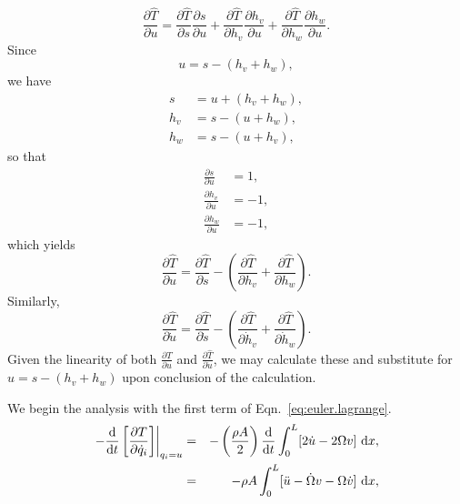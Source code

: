 \begin{equation}
\frac{\partial\hat T}{\partial u} = \frac{\partial \hat T}{\partial s}\frac{\partial s}{\partial u}+\frac{\partial \hat T}{\partial h_v}\frac{\partial h_v}{\partial u}+\frac{\partial \hat T}{\partial h_w}\frac{\partial h_w}{\partial u}.
\end{equation}
Since
\begin{equation}
u = s-(h_v+h_w),
\end{equation}
we have
\begin{eqnarray}
s &= u+(h_v+h_w),\\
h_v &= s-(u+h_w),\\
h_w &= s-(u+h_v),
\end{eqnarray}
so that
\begin{eqnarray}
\frac{\partial s}{\partial u} &= 1,\\
\frac{\partial h_v}{\partial u} &= -1,\\
\frac{\partial h_w}{\partial u} &= -1,
\end{eqnarray}
which yields
\begin{equation}
\frac{\partial\hat T}{\partial u} = \frac{\partial \hat T}{\partial s}-\left(\frac{\partial \hat T}{\partial h_v}+\frac{\partial \hat T}{\partial h_w}\right).
\end{equation}
Similarly,
\begin{equation}
\frac{\partial\hat T}{\partial \dot u} = \frac{\partial \hat T}{\partial \dot s}-\left(\frac{\partial \hat T}{\partial \dot h_v}+\frac{\partial \hat T}{\partial \dot h_w}\right).
\end{equation}
Given the linearity of both $\frac{\partial \hat T}{\partial u}$ and $\frac{\partial \hat T}{\partial \dot u}$, we may calculate these and substitute for $u=s-(h_v+h_w)$ upon conclusion of the calculation.

We begin the analysis with the first term of Eqn.~\ref{eq:euler.lagrange}.
\begin{eqnarray}
\left.-\frac{\text d}{\text dt}\left[\frac{\partial T}{\partial \dot q_i}\right]\right|_{q_i=u} 
&=& -\left(\frac{\rho A}{2}\right)\frac{\text d}{\text dt}\int_0^L[2\dot u-2\Omega v]\text{ d}x,\\
&=& -\rho A\int_0^L [\ddot u-\dot \Omega v-\Omega \dot v]\text{ d}x,
\end{eqnarray}

